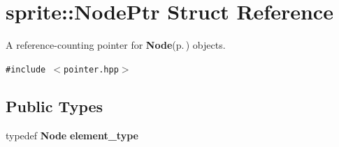 \section{sprite::Node\-Ptr Struct Reference}
\label{structsprite_1_1NodePtr}
A reference-counting pointer for {\bf Node}{\rm (p.\,\pageref{structsprite_1_1Node})} objects.  


{\tt \#include $<$pointer.hpp$>$}

\subsection*{Public Types}
\begin{CompactItemize}
\item 
typedef {\bf Node} {\bf element\_\-type}\label{structsprite_1_1NodePtr_w0}

\end{CompactItemize}
